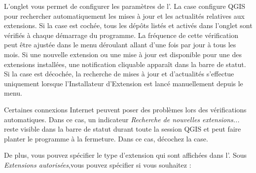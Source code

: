 L'onglet  vous permet de configurer les paramètres de l'. La case  configure QGIS pour rechercher automatiquement les mises à jour et les actualités relatives aux extensions. Si la case est cochée, tous les dépôts listés et activés dans l'onglet  sont vérifiés à chaque démarrage du programme. La fréquence de cette vérification peut être ajustée dans le menu déroulant allant d'une fois par jour à tous les mois. Si une nouvelle extension ou une mise à jour est disponible pour une des extensions installées, une notification cliquable apparaît dans la barre de statut. Si la case est décochée, la recherche de mises à jour et d'actualités s'effectue uniquement lorsque l'Installateur d'Extension est lancé manuellement depuis le menu.


Certaines connexions Internet peuvent poser des problèmes lors des vérifications automatiques. Dans ce cas, un indicateur \textit{Recherche de nouvelles extensions...} reste visible dans la barre de statut durant toute la session QGIS et peut faire planter le programme à la fermeture. Dans ce cas, décochez la case.

De plus, vous pouvez spécifier le type d'extension qui sont affichées dans l'. Sous \textit{Extensions autorisées},vous pouvez spécifier si vous souhaitez :

